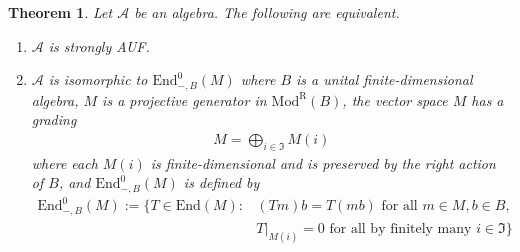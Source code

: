 \documentclass[11pt,b5paper,notitlepage]{article}
\theoremstyle{definition}
\theoremstyle{plain}
\newtheorem{thm}[df]{Theorem}
\newcommand{\fk}{\mathfrak}
\newcommand{\mc}{\mathcal}
\newcommand{\End}{\mathrm{End}} %
\newcommand{\ModR}{\mathrm{Mod}^{\mathrm R}}
\numberwithin{equation}{section}
\begin{document}
\begin{thm}\label{lb65}
Let $\mc A$ be an algebra. The following are equivalent.
\begin{enumerate}[label=(\arabic*)]
\item $\mc A$ is strongly AUF.
\item $\mc A$ is isomorphic to $\End^0_{-,B}(M)$ where $B$ is a unital finite-dimensional algebra, $M$ is a projective generator in $\ModR(B)$, the vector space $M$ has a grading
\begin{align*}
M=\bigoplus_{i\in\fk I}M(i)
\end{align*}
where each $M(i)$ is finite-dimensional and is preserved by the right action of $B$, and $\End^0_{-,B}(M)$ is defined by
\begin{align*}
\End^0_{-,B}(M):=\{T\in\End(M):&(Tm)b=T(mb)\text{ for all $m\in M,b\in B$,}\\
&T|_{M(i)}=0\text{ for all by finitely many }i\in\fk I \}
\end{align*}
\end{enumerate}
\end{thm}
\end{document}

